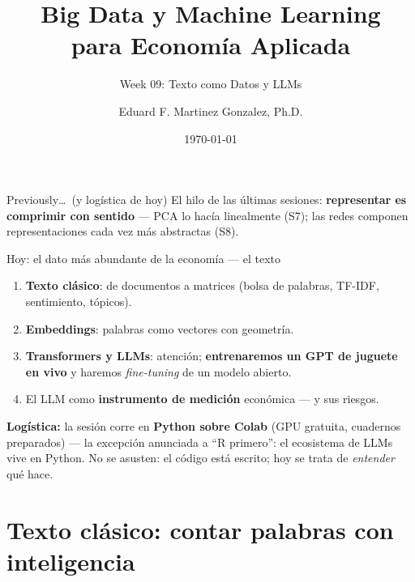 \documentclass{beamer}
\title[BDML]{Big Data y Machine Learning \\ para Economía Aplicada}
\subtitle{Week 09: Texto como Datos y LLMs}
\author{Eduard F. Martinez Gonzalez, Ph.D.}
\institute[]{Departamento de Economía, Universidad Icesi}
\date{\today}
\newcommand{\1}{\mathbb{I}}
\begin{document}
\begin{frame}
\titlepage
\end{frame}

\begin{frame}{Previously\ldots\ (y logística de hoy)}
\small
El hilo de las últimas sesiones: \textbf{representar es comprimir con sentido} --- PCA lo hacía linealmente (S7); las redes componen representaciones cada vez más abstractas (S8).
\pause

\vspace{0.15cm}
\begin{block}{Hoy: el dato más abundante de la economía --- el texto}
\begin{enumerate}\itemsep2pt
  \item \textbf{Texto clásico}: de documentos a matrices (bolsa de palabras, TF-IDF, sentimiento, tópicos).
  \item \textbf{Embeddings}: palabras como vectores con geometría.
  \item \textbf{Transformers y LLMs}: atención; \textbf{entrenaremos un GPT de juguete en vivo} y haremos \emph{fine-tuning} de un modelo abierto.
  \item El LLM como \textbf{instrumento de medición} económica --- y sus riesgos.
\end{enumerate}
\end{block}
\pause

\vspace{0.15cm}
\textbf{Logística:} la sesión corre en \textbf{Python sobre Colab} (GPU gratuita, cuadernos preparados) --- la excepción anunciada a ``R primero'': el ecosistema de LLMs vive en Python. No se asusten: el código está escrito; hoy se trata de \emph{entender} qué hace.
\end{frame}


\section{Texto clásico: contar palabras con inteligencia}
\begin{frame}[noframenumbering]
\tableofcontents[currentsection]
\end{frame}
\end{document}
